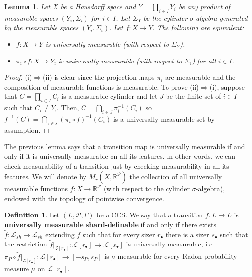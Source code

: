 \documentclass[psamsfonts]{amsart}
\newtheorem{lem}[thm]{Lemma}
\theoremstyle{definition}
\newtheorem{defn}[thm]{Definition}
\theoremstyle{remark}
\numberwithin{equation}{section}
\begin{document}
\begin{lem}
    Let $X$ be a Hausdorff space and $Y=\prod_{i\in I}Y_i$ be any product of measurable spaces $(Y_i,\Sigma_i)$ for $i\in I$. Let $\Sigma_Y$ be the cylinder $\sigma$-algebra generated by the measurable spaces $(Y_i,\Sigma_i)$. Let $f:X\rightarrow Y$. The following are equivalent:
    \begin{itemize}
        \item [(i)] $f:X\rightarrow Y$ is universally measurable (with respect to $\Sigma_Y$).
        \item [(ii)] $\pi_i\circ f:X\rightarrow Y_i$ is universally measurable (with respect to $\Sigma_i$) for all $i\in I$.
    \end{itemize}
\end{lem}

\begin{proof}
    (i)$\Rightarrow$(ii) is clear since the projection maps $\pi_i$ are measurable and the composition of measurable functions is measurable. To prove (ii)$\Rightarrow$(i), suppose that $C=\prod_{i\in I}C_i$ is a measurable cylinder and let $J$ be the finite set of $i\in I$ such that $C_i\neq Y_i$. Then, $C=\bigcap_{i\in J}\pi_i^{-1}(C_i)$ so $f^{-1}(C)=\bigcap_{i\in J}(\pi_i\circ f)^{-1}(C_i)$ is a universally measurable set by assumption.
\end{proof}

The previous lemma says that a transition map is universally measurable if and only if it is universally measurable on all its features. In other words, we can check measurability of a transition just by checking measurability in all its features. We will denote by $M_r(X,\mathbb{R}^\mathcal{P})$ the collection of all universally measurable functions $f:X\rightarrow\mathbb{R}^\mathcal{P}$ (with respect to the cylinder $\sigma$-algebra), endowed with the topology of pointwise convergence.

\begin{defn}
    Let $(L,\mathcal P,\Gamma)$ be a CCS. We say that a transition $f:L\rightarrow L$ is \textbf{universally measurable shard-definable} if and only if there exists $\tilde f:\mathcal{L}_{sh}\rightarrow \mathcal{L}_{sh}$ extending $f$ such that for every sizer $r_\bullet$ there is a sizer $s_\bullet$ such that the restriction $\tilde f|_{\mathcal{L}[r_{\bullet}]}:\mathcal{L}[r_\bullet]\rightarrow\mathcal{L}[s_\bullet]$ is universally measurable, i.e. $\pi_P\circ \tilde f|_{\mathcal{L}[r_{\bullet}]}:\mathcal{L}[r_\bullet]\rightarrow [-s_P,s_P]$ is $\mu$-measurable for every Radon probability measure $\mu$ on $\mathcal{L}[r_\bullet]$.
\end{defn}
\end{document}
